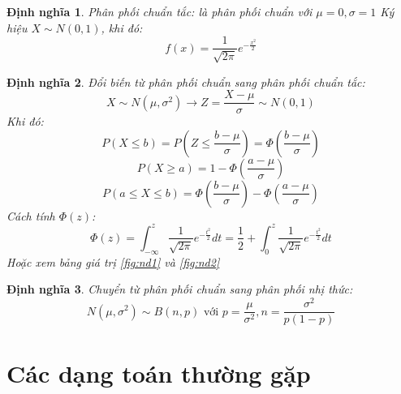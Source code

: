 \documentclass[12pt]{article}
\newtheorem{thm}{Định nghĩa}
\begin{document}
\begin{thm}
    Phân phối chuẩn tắc: là phân phối chuẩn với $\mu = 0, \sigma = 1$ Ký hiệu $X \sim N(0, 1)$, khi đó:
    \begin{equation}
        f(x) = \frac{1}{\sqrt{2\pi}}e^{-\frac{x^2}{2}}
    \end{equation}
\end{thm}
\begin{thm}
    Đổi biến từ phân phối chuẩn sang phân phối chuẩn tắc:
    \begin{equation}
        X \sim N(\mu, \sigma^2) \rightarrow Z = \frac{X - \mu}{\sigma} \sim N(0, 1)
    \end{equation}
    Khi đó:
    \begin{equation}
        P(X \leq b) = P(Z \leq \frac{b - \mu}{\sigma}) = \Phi(\frac{b - \mu}{\sigma})
    \end{equation}
    \begin{equation}
        P(X \geq a) = 1 - \Phi(\frac{a - \mu}{\sigma})
    \end{equation}
    \begin{equation}
        P(a \leq X \leq b) = \Phi(\frac{b - \mu}{\sigma}) - \Phi(\frac{a - \mu}{\sigma})
    \end{equation}
    Cách tính $\Phi(z)$:
    \begin{equation}
        \Phi(z) = \int_{-\infty}^z \frac{1}{\sqrt{2\pi}}e^{-\frac{t^2}{2}}dt = \frac{1}{2} + \int_{0}^z \frac{1}{\sqrt{2\pi}}e^{-\frac{t^2}{2}}dt
    \end{equation}
    Hoặc xem bảng giá trị \ref{fig:nd1} và \ref{fig:nd2}
\end{thm}

\begin{thm}
    Chuyển từ phân phối chuẩn sang phân phối nhị thức:
    \begin{equation}
        N(\mu, \sigma^2) \sim B(n, p) \text{ với } p = \frac{\mu}{\sigma^2}, n = \frac{\sigma^2}{p(1 - p)}
    \end{equation}

\end{thm}

\section {Các dạng toán thường gặp}
\end{document}
